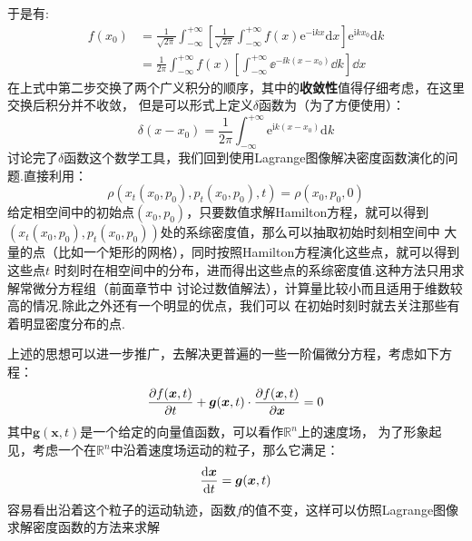    于是有:
    \begin{equation}
        \begin{split}
            f(x_0) &= \frac 1{\sqrt{2\pi}} \int_{-\infty}^{+\infty}\left[\frac 1{\sqrt{2\pi}} 
            \int_{-\infty}^{+\infty} f(x)\mathrm{e}^{-\mathrm{i}kx}\mathrm{d}x\right] \mathrm{e}^{\mathrm{i}kx_0}\mathrm{d}k\\
            &= \frac 1{2\pi} \int_{-\infty}^{+\infty}f(x)\left[\int_{-\infty}^{+\infty}\ee^{-\ii k(x - x_0)}\dd k\right]\dd x
        \end{split}
    \end{equation}
    在上式中第二步交换了两个广义积分的顺序，其中的\textbf{收敛性}值得仔细考虑，在这里交换后积分并不收敛，
    但是可以形式上定义$\delta$函数为（为了方便使用）：
    \begin{equation}
        \delta(x-x_0) = \frac 1{2\pi} \int_{-\infty}^{+\infty} \mathrm{e}^{\mathrm{i}k(x-x_0)}\mathrm{d}k
        \label{integral formation of delta function}
    \end{equation}
    讨论完了$\delta$函数这个数学工具，我们回到使用Lagrange图像解决密度函数演化的问题.直接利用：
    \begin{equation}
        \rho(x_t(x_0, p_0), p_t(x_0, p_0), t) = \rho(x_0, p_0, 0)
    \end{equation}
    给定相空间中的初始点$(x_0, p_0)$，只要数值求解Hamilton方程，就可以得到
    $(x_t(x_0, p_0), p_t(x_0, p_0))$处的系综密度值，那么可以抽取初始时刻相空间中
    大量的点（比如一个矩形的网格），同时按照Hamilton方程演化这些点，就可以得到这些点$t$
    时刻时在相空间中的分布，进而得出这些点的系综密度值.这种方法只用求解常微分方程组（前面章节中
    讨论过数值解法），计算量比较小而且适用于维数较高的情况.除此之外还有一个明显的优点，我们可以
    在初始时刻时就去关注那些有着明显密度分布的点.
    \par 
    上述的思想可以进一步推广，去解决更普遍的一些一阶偏微分方程，考虑如下方程：
    \begin{equation}
        \frac{\partial{f(\bm{x}, t)}}{\partial{t}} + \bm{g}(\bm{x}, t) \cdot \frac{\partial{f(\bm{x}, t)}}{\partial{\bm{x}}} = 0
    \end{equation}
    其中$\bm{g}(\bm{x}, t)$是一个给定的向量值函数，可以看作$\mathbb{R}^n$上的速度场，
    为了形象起见，考虑一个在$\mathbb{R}^n$中沿着速度场运动的粒子，那么它满足：
    \begin{equation}
        \frac{\mathrm{d}{\bm{x}}}{\mathrm{d}{t}} = \bm{g}(\bm{x}, t)
        \label{character line}
    \end{equation}
    容易看出沿着这个粒子的运动轨迹，函数$f$的值不变，这样可以仿照Lagrange图像求解密度函数的方法来求解

